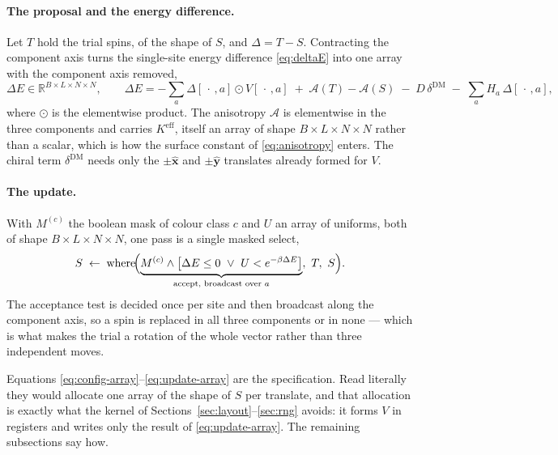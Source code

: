 \documentclass[11pt,a4paper]{article}
\begin{document}
\paragraph{The proposal and the energy difference.} Let $T$ hold the trial
spins, of the shape of $S$, and $\Delta = T - S$. Contracting the component
axis turns the single-site energy difference \eqref{eq:deltaE} into one array
with the component axis removed,
%
\begin{equation}
\Delta E \in \mathbb{R}^{B \times L \times N \times N},
\qquad
\Delta E = -\sum_{a} \Delta[\,\cdot\,,a] \odot V[\,\cdot\,,a]
  \;+\; \mathcal{A}(T) - \mathcal{A}(S)
  \;-\; D\,\delta^{\mathrm{DM}} \;-\; \sum_a H_a\, \Delta[\,\cdot\,,a] ,
\label{eq:dE-array}
\end{equation}
%
where $\odot$ is the elementwise product. The anisotropy $\mathcal{A}$ is
elementwise in the three components and carries $K^{\mathrm{eff}}$, itself an
array of shape $B \times L \times N \times N$ rather than a scalar, which is how
the surface constant of \eqref{eq:anisotropy} enters. The chiral term
$\delta^{\mathrm{DM}}$ needs only the $\pm\hat{\mathbf{x}}$ and
$\pm\hat{\mathbf{y}}$ translates already formed for $V$.

\paragraph{The update.} With $M^{(c)}$ the boolean mask of colour class $c$ and
$U$ an array of uniforms, both of shape $B \times L \times N \times N$, one pass
is a single masked select,
%
\begin{equation}
S \;\leftarrow\; \operatorname{where}\!\Bigl(
  \underbrace{M^{(c)} \wedge \bigl[\Delta E \le 0 \ \vee \
     U < e^{-\beta \Delta E}\bigr]}_{\text{accept, broadcast over } a},
  \ T, \ S \Bigr).
\label{eq:update-array}
\end{equation}
%
The acceptance test is decided once per site and then broadcast along the
component axis, so a spin is replaced in all three components or in none ---
which is what makes the trial a rotation of the whole vector rather than three
independent moves.

Equations \eqref{eq:config-array}--\eqref{eq:update-array} are the
specification. Read literally they would allocate one array of the shape of $S$
per translate, and that allocation is exactly what the kernel of
Sections~\ref{sec:layout}--\ref{sec:rng} avoids: it forms $V$ in registers and
writes only the result of \eqref{eq:update-array}. The remaining subsections
say how.
\end{document}
